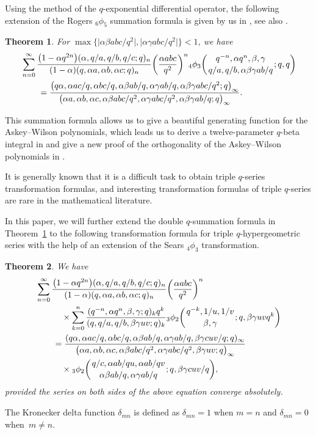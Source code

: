 \documentclass[pdftex]{sigma}
\numberwithin{equation}{section}
\newtheorem{Theorem}{Theorem}[section]
\begin{document}
Using the method of the $q$-exponential differential operator,
the following extension of the Rogers $_6\phi_5$ summation formula is given by us in \cite[Theorem~3]{Liu2011}, see also \cite[Theorem~6.2]{LiuRam2013}.
\begin{Theorem}\label{rogersliuthm}
	For $\max\bigl\{\bigl|\alpha \beta abc/q^2\bigr|, \bigl|\alpha \gamma abc/q^2\bigr|\bigr\}<1$, we have
	\begin{align*}
		&\sum_{n=0}^\infty \frac{\bigl(1-\alpha q^{2n}\bigr)(\alpha, q/a, q/b, q/c; q)_n}{(1-\alpha)(q, \alpha a, \alpha b, \alpha c; q)_n}
		\biggl(\frac{\alpha abc}{q^2}\biggr)^n {_4 \phi_3} \biggl({{q^{-n}, \alpha q^n, \beta, \gamma}
			\atop{q/a, q/b,\alpha \beta \gamma ab/q}}; q, q\biggr)\\
		&\qquad{}=\frac{\bigl(q\alpha, \alpha ac/q, \alpha bc/q, \alpha \beta ab/q, \alpha \gamma ab/q, \alpha \beta \gamma abc/q^2; q\bigr)_\infty}
		{\bigl(\alpha a, \alpha b, \alpha c, \alpha \beta abc/q^2, \alpha \gamma abc/q^2, \alpha \beta \gamma ab/q; q\bigr)_\infty}.
	\end{align*}
\end{Theorem}
 This summation formula allows us to give a beautiful generating function for the Askey--Wilson polynomials, which leads us
 to derive a twelve-parameter $q$-beta integral in \cite{Liu2019} and give a new proof of the orthogonality of the Askey--Wilson polynomials in \cite{Liu2021}.

It is generally known that it is a difficult task to obtain triple $q$-series transformation formulas, and interesting transformation formulas of triple $q$-series are rare in the mathematical literature.

In this paper, we will further extend the double $q$-summation formula in Theorem~\ref{rogersliuthm} to
the following transformation formula for triple $q$-hypergeometric series with the help of an extension of the Sears $_4\phi_3$ transformation.
\begin{Theorem}\label{liuthma} We have
	\begin{align*}
		&\sum_{n=0}^\infty \frac{\bigl(1-\alpha q^{2n}\bigr)(\alpha, q/a, q/b, q/c; q)_n}{(1-\alpha)(q, \alpha a, \alpha b, \alpha c; q)_n}
		\biggl(\frac{\alpha abc}{q^2}\biggr)^n \\
		&\qquad\quad{} \times \sum_{k=0}^{n} \frac{(q^{-n}, \alpha q^n, \beta, \gamma; q)_k q^k}
		{(q, q/a, q/b, \beta \gamma uv; q)_k}
		{_3\phi_2 \biggl({{q^{-k}, 1/u, 1/v}\atop{\beta, \gamma}}; q, \beta \gamma uv q^k\biggr)}\\
		&\qquad{}=\frac{(q\alpha, \alpha ac/q, \alpha bc/q, \alpha \beta ab/q, \alpha \gamma ab/q, \beta \gamma cuv/q; q )_\infty}{\bigl(\alpha a, \alpha b, \alpha c, \alpha \beta abc/q^2, \alpha \gamma abc/q^2, \beta \gamma uv; q \bigr)_\infty}\\
		&\qquad\quad{} \times{_3\phi_2} \biggl({{q/c, \alpha ab/qu, \alpha ab/qv}\atop{\alpha \beta ab/q, \alpha \gamma ab/q}}; q,
		\beta \gamma cuv/q \biggr),
	\end{align*}
	provided the series on both sides of the above equation converge absolutely.
\end{Theorem}
 The Kronecker delta function $\delta_{mn}$ is defined as $\delta_{mn}=1$ when $m=n$ and $\delta_{mn}=0$ when~${m\not=n}$.
\end{document}
